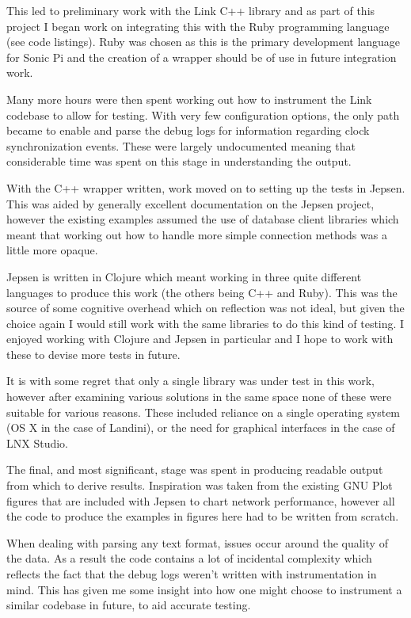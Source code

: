 \documentclass[11pt]{article} %
\theoremstyle{plain}
\theoremstyle{definition}
\begin{document}
This led to preliminary work with the Link C++ library and as part of this
project I began work on integrating this with the Ruby programming language
(see code listings). Ruby was chosen as this is the primary development
language for Sonic Pi and the creation of a wrapper should be of use in future
integration work.

Many more hours were then spent working out how to instrument the Link codebase
to allow for testing. With very few configuration options, the only path
became to enable and parse the debug logs for information regarding clock
synchronization events. These were largely undocumented meaning that
considerable time was spent on this stage in understanding the output.

With the C++ wrapper written, work moved on to setting up the tests in Jepsen.
This was aided by generally excellent documentation on the Jepsen project,
however the existing examples assumed the use of database client libraries
which meant that working out how to handle more simple connection methods was a
little more opaque.

Jepsen is written in Clojure which meant working in three quite different
languages to produce this work (the others being C++ and Ruby). This was the
source of some cognitive overhead which on reflection was not ideal, but given
the choice again I would still work with the same libraries to do this kind of
testing. I enjoyed working with Clojure and Jepsen in particular and I hope to
work with these to devise more tests in future.

It is with some regret that only a single library was under test in this work,
however after examining various solutions in the same space none of these were
suitable for various reasons. These included reliance on a single operating
system (OS X in the case of Landini\cite{narveson2013landini}), or the need for
graphical interfaces in the case of LNX Studio\cite{lnxstudio}.

The final, and most significant, stage was spent in producing readable output
from which to derive results. Inspiration was taken from the existing
GNU Plot figures that are included with Jepsen to chart network performance,
however all the code to produce the examples in figures here had to be written
from scratch.

When dealing with parsing any text format, issues occur around the quality of
the data. As a result the code contains a lot of incidental complexity which
reflects the fact that the debug logs weren't written with instrumentation in
mind. This has given me some insight into how one might choose to instrument a
similar codebase in future, to aid accurate testing.
\end{document}
